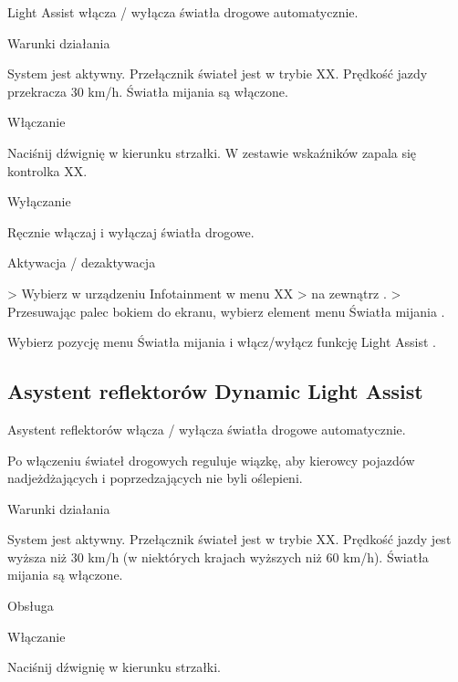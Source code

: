 Light Assist włącza / wyłącza światła drogowe automatycznie.

Warunki działania
\begin{itemizeTick}
	\itemTick System jest aktywny.
	\itemTick Przełącznik świateł jest w trybie XX.
	\itemTick Prędkość jazdy przekracza 30 km/h.
	\itemTick Światła mijania są włączone.
\end{itemizeTick}

Włączanie


Naciśnij dźwignię w kierunku strzałki.
W zestawie wskaźników zapala się kontrolka XX.

Wyłączanie
\begin{itemizeArrow}
	\itemArrow Ręcznie włączaj i wyłączaj światła drogowe.
\end{itemizeArrow}


Aktywacja / dezaktywacja

> Wybierz w urządzeniu Infotainment w menu XX > na zewnątrz .
> Przesuwając palec bokiem do ekranu, wybierz element menu Światła mijania .
\begin{itemizeArrow}
	\itemArrow Wybierz pozycję menu Światła mijania i włącz/wyłącz funkcję Light Assist .
\end{itemizeArrow}

\subsection{Asystent reflektorów Dynamic Light Assist}

Asystent reflektorów włącza / wyłącza światła drogowe automatycznie.

Po włączeniu świateł drogowych reguluje wiązkę, aby kierowcy pojazdów nadjeżdżających i poprzedzających nie byli oślepieni.

Warunki działania
\begin{itemizeTick}
	\itemTick System jest aktywny.
	\itemTick Przełącznik świateł jest w trybie XX.
	\itemTick Prędkość jazdy jest wyższa niż 30 km/h (w niektórych krajach wyższych niż 60 km/h).
	\itemTick Światła mijania są włączone.
\end{itemizeTick}

Obsługa

Włączanie


\begin{itemizeArrow}
	\itemArrow Naciśnij dźwignię w kierunku strzałki.
\end{itemizeArrow}

